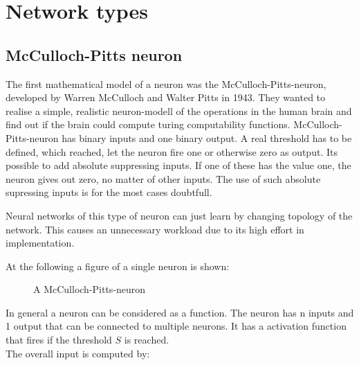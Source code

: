 \documentclass[10pt,a4paper,DIV=11]{scrreprt}
\begin{document}
\section{Network types}

\subsection{McCulloch-Pitts neuron}
The first mathematical model of a neuron was the McCulloch-Pitts-neuron,
developed by Warren McCulloch and Walter Pitts in 1943.
They wanted to realise a simple, realistic neuron-modell of the operations in the human brain and find out if the brain could compute turing computability functions.
McCulloch-Pitts-neuron has binary inputs and one binary output.
A real threshold has to be defined, which reached, let the neuron fire one or otherwise zero as output.
Its possible to add absolute suppressing inputs. If one of these has the value one, the neuron gives out zero, no matter of other inputs. The use of such absolute supressing inputs is for the most cases doubtfull.


Neural networks of this type of neuron can just learn by changing topology of the network. This causes an unnecessary workload due to its high effort in implementation.

At the following a figure of a single neuron is shown:

\begin{figure}[H]  %
	\centering
	\caption{A McCulloch-Pitts-neuron}
	\label{fig:pitts1}
\end{figure}

In general a neuron can be considered as a function.
The neuron has n inputs and 1 output that can be connected to multiple neurons. It has a activation function that fires if the threshold $S$ is reached. \\

The overall input is computed by:
\end{document}
